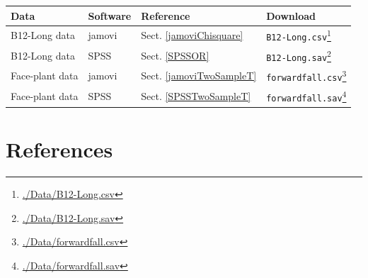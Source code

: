 \documentclass[
  11pt,
  a4paper,
]{krantz}
\newcounter{none} %
\renewcommand{\href}[2]{#2\footnote{\url{#1}}}
\begin{document}
{\def\LTcaptype{none} %
\begin{longtable}[]{@{}
  >{\raggedright\arraybackslash}p{}
  >{\centering\arraybackslash}p{}
  >{\centering\arraybackslash}p{}
  >{\centering\arraybackslash}p{}@{}}
\toprule\noalign{}
\begin{minipage}[b]{\linewidth}\raggedright
\textbf{Data}
\end{minipage} & \begin{minipage}[b]{\linewidth}\centering
\textbf{Software}
\end{minipage} & \begin{minipage}[b]{\linewidth}\centering
\textbf{Reference}
\end{minipage} & \begin{minipage}[b]{\linewidth}\centering
\textbf{Download}
\end{minipage} \\
\midrule\noalign{}
\endhead
\bottomrule\noalign{}
\endlastfoot
B12-Long data & jamovi & Sect. \ref{jamoviChisquare} & \href{./Data/B12-Long.csv}{\texttt{B12-Long.csv}} \\
B12-Long data & SPSS & Sect. \ref{SPSSOR} & \href{./Data/B12-Long.sav}{\texttt{B12-Long.sav}} \\
Face-plant data & jamovi & Sect. \ref{jamoviTwoSampleT} & \href{./Data/forwardfall.csv}{\texttt{forwardfall.csv}} \\
Face-plant data & SPSS & Sect. \ref{SPSSTwoSampleT} & \href{./Data/forwardfall.sav}{\texttt{forwardfall.sav}} \\
\end{longtable}
}

\chapter*{References}\label{references}
\end{document}
